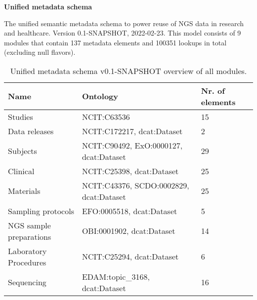 \documentclass{article}
\begin{document}
\setlength\parindent{0pt}

\textbf{Unified metadata schema}
\newline

The unified semantic metadata schema to power reuse of NGS data in research and healthcare. Version 0.1-SNAPSHOT, 2022-02-23. This model consists of 9 modules that contain 137 metadata elements and 100351 lookups in total (excluding null flavors).

\begin{table}[htb]
\begin{tabular}{lll}
Name & Ontology & Nr. of elements \\
\hline
Studies & NCIT:C63536  & 15 \\
Data releases & NCIT:C172217, dcat:Dataset  & 2 \\
Subjects & NCIT:C90492, ExO:0000127, dcat:Dataset  & 29 \\
Clinical & NCIT:C25398, dcat:Dataset  & 25 \\
Materials & NCIT:C43376, SCDO:0002829, dcat:Dataset  & 25 \\
Sampling protocols & EFO:0005518, dcat:Dataset  & 5 \\
NGS sample preparations & OBI:0001902, dcat:Dataset  & 14 \\
Laboratory Procedures & NCIT:C25294, dcat:Dataset  & 6 \\
Sequencing & EDAM:topic\_3168, dcat:Dataset  & 16 \\
\hline
\end{tabular}
\caption[Module overview]{\label{table:table1} Unified metadata schema v0.1-SNAPSHOT overview of all modules.}
\end{table}
\end{document}
